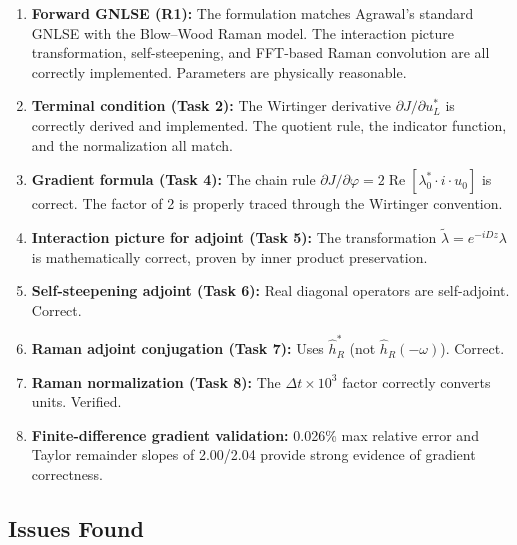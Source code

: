 \documentclass[12pt,a4paper]{article}
\newcommand{\Real}{\operatorname{Re}}
\theoremstyle{definition}
\begin{document}
\begin{enumerate}[leftmargin=*]
\item \textbf{Forward GNLSE (R1):} The formulation matches Agrawal's standard GNLSE with the Blow--Wood Raman model. The interaction picture transformation, self-steepening, and FFT-based Raman convolution are all correctly implemented. Parameters are physically reasonable.

\item \textbf{Terminal condition (Task 2):} The Wirtinger derivative $\partial J/\partial u_L^*$ is correctly derived and implemented. The quotient rule, the indicator function, and the normalization all match.

\item \textbf{Gradient formula (Task 4):} The chain rule $\partial J/\partial\varphi = 2\Real[\lambda_0^* \cdot i \cdot u_0]$ is correct. The factor of 2 is properly traced through the Wirtinger convention.

\item \textbf{Interaction picture for adjoint (Task 5):} The transformation $\tilde{\lambda} = e^{-iDz}\lambda$ is mathematically correct, proven by inner product preservation.

\item \textbf{Self-steepening adjoint (Task 6):} Real diagonal operators are self-adjoint. Correct.

\item \textbf{Raman adjoint conjugation (Task 7):} Uses $\hat{h}_R^*$ (not $\hat{h}_R(-\omega)$). Correct.

\item \textbf{Raman normalization (Task 8):} The $\Delta t \times 10^3$ factor correctly converts units. Verified.

\item \textbf{Finite-difference gradient validation:} 0.026\% max relative error and Taylor remainder slopes of 2.00/2.04 provide strong evidence of gradient correctness.
\end{enumerate}

\subsection{Issues Found}
\end{document}
